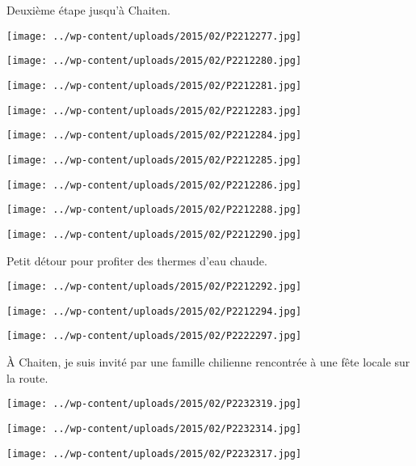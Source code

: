 Deuxième étape jusqu'à Chaiten.
\begin{center} \texttt{[image: ../wp-content/uploads/2015/02/P2212277.jpg]} \end{center}
\begin{center} \texttt{[image: ../wp-content/uploads/2015/02/P2212280.jpg]} \end{center}
\begin{center} \texttt{[image: ../wp-content/uploads/2015/02/P2212281.jpg]} \end{center}
\begin{center} \texttt{[image: ../wp-content/uploads/2015/02/P2212283.jpg]} \end{center}
\begin{center} \texttt{[image: ../wp-content/uploads/2015/02/P2212284.jpg]} \end{center}
\begin{center} \texttt{[image: ../wp-content/uploads/2015/02/P2212285.jpg]} \end{center}
\begin{center} \texttt{[image: ../wp-content/uploads/2015/02/P2212286.jpg]} \end{center}
\begin{center} \texttt{[image: ../wp-content/uploads/2015/02/P2212288.jpg]} \end{center}
\begin{center} \texttt{[image: ../wp-content/uploads/2015/02/P2212290.jpg]} \end{center}

\pagebreak
Petit détour pour profiter des thermes d'eau chaude.
\begin{center} \texttt{[image: ../wp-content/uploads/2015/02/P2212292.jpg]} \end{center}
\begin{center} \texttt{[image: ../wp-content/uploads/2015/02/P2212294.jpg]} \end{center}
\begin{center} \texttt{[image: ../wp-content/uploads/2015/02/P2222297.jpg]} \end{center}

\`A Chaiten, je suis invité par une famille chilienne rencontrée à une fête locale sur la route.
\begin{center} \texttt{[image: ../wp-content/uploads/2015/02/P2232319.jpg]} \end{center}
\begin{center} \texttt{[image: ../wp-content/uploads/2015/02/P2232314.jpg]} \end{center}
\begin{center} \texttt{[image: ../wp-content/uploads/2015/02/P2232317.jpg]} \end{center}

